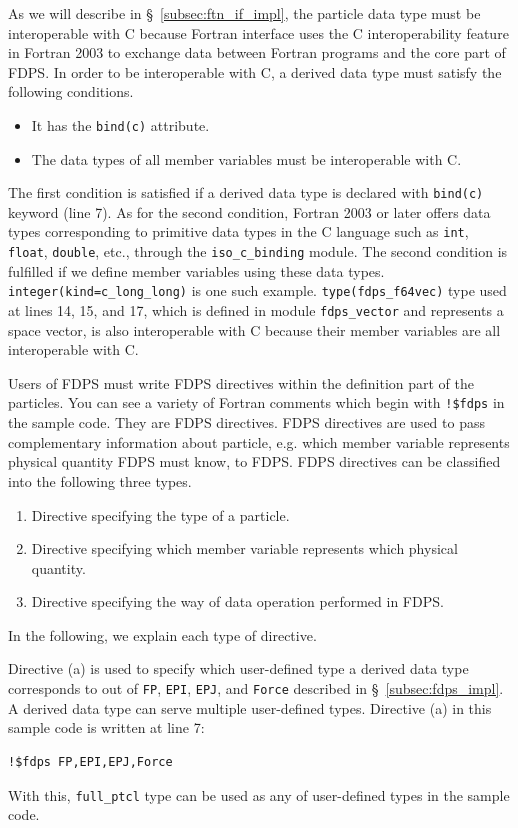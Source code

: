 \documentclass[proof,useamsfonts]{pasj01}
\begin{document}
As we will describe in \S~\ref{subsec:ftn_if_impl}, the particle data type must be interoperable with C because Fortran interface uses the C interoperability feature in Fortran 2003 to exchange data between Fortran programs and the core part of FDPS. In order to be interoperable with C, a derived data type must satisfy the following conditions.
\begin{itemize}
\item It has the \texttt{bind(c)} attribute.
\item The data types of all member variables must be interoperable with C.
\end{itemize}
The first condition is satisfied if a derived data type is declared with \texttt{bind(c)} keyword (line 7). As for the second condition, Fortran 2003 or later offers data types corresponding to primitive data types in the C language such as \texttt{int}, \texttt{float}, \texttt{double}, etc.,  through the \texttt{iso\_c\_binding} module. The second condition is fulfilled if we define member variables using these data types. \texttt{integer(kind=c\_long\_long)} is one such example. \texttt{type(fdps\_f64vec)} type used at lines 14, 15, and 17, which is defined in module \texttt{fdps\_vector} and represents a space vector, is also interoperable with C because their member variables are all interoperable with C.

Users of FDPS must write FDPS directives within the definition part of the particles. You can see a variety of Fortran comments which begin with  \texttt{!\$fdps} in the sample code. They are FDPS directives. FDPS directives are used to pass complementary information about particle, e.g. which member variable represents physical quantity FDPS must know, to FDPS. FDPS directives can be classified into the following three types.
\begin{enumerate}[label=(\alph*)]
\item Directive specifying the type of a particle. 
\item Directive specifying which member variable represents which physical quantity.
\item Directive specifying the way of data operation performed in FDPS.  
\end{enumerate}
In the following, we explain each type of directive.

Directive (a) is used to specify which user-defined type a derived data type corresponds to out of \texttt{FP}, \texttt{EPI}, \texttt{EPJ}, and \texttt{Force} described in \S~\ref{subsec:fdps_impl}. A derived data type can serve multiple user-defined types. Directive (a) in this sample code is written at line 7:
\begin{verbatim}
!$fdps FP,EPI,EPJ,Force
\end{verbatim}
With this, \texttt{full\_ptcl} type can be used as any of user-defined types in the sample code.
\end{document}
